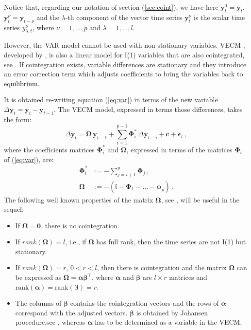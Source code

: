 Notice that, regarding our notation of section (\ref{sec:coint}),
we have here 
$\mathbf{y}_t^0 = \mathbf{y}_t$,
$\mathbf{y}_t^\nu = \mathbf{y}_{t-\nu}$ and
the $\lambda$-th component of the vector time series $\mathbf{y}_t^\nu$
is the scalar time series $y_{\lambda,t}^\nu$, where $\nu=1,\dots,p$ and
$\lambda=1,\dots,l$.

However, the VAR model cannot be used with non-stationary variables. VECM ,
developed by \cite{engle87}, is also a linear model for I(1) variables that are
also cointegrated, see \cite{banerjee1993}. If cointegration exists, variable
differences are stationary and they introduce an error correction term which
adjusts coefficients to bring the variables back to equilibrium. 


It is obtained re-writing equation (\ref{eq:var}) in terms of the new
variable $\Delta\mathbf{y}_t=\mathbf{y}_t-\mathbf{y}_{t-1}$.
The VECM model, expressed in terms those differences, takes the form:
\begin{equation}\label{eq:vec}
\Delta \mathbf{y}_t 
= \boldsymbol{\Omega}\,\mathbf{y}_{t-1}
  + \sum_{i=1}^{p-1} \boldsymbol{\Phi}_i^*\,\Delta\mathbf{y}_{t-i}
  + \mathbf{c} + \boldsymbol{\epsilon}_t\,,
\end{equation}
\noindent
where the coefficients matrices $\boldsymbol{\Phi}_i^*$ and 
$\boldsymbol{\Omega}$, expressed in terms of the matrices
$\boldsymbol{\Phi}_i$ of (\ref{eq:var}), are:
\begin{align*}
\boldsymbol{\Phi}_i^* 
&:= -\sum_{j=i+1}^{p}\boldsymbol{\Phi}_j\,, \\
\boldsymbol{\Omega}
&:= -\left( \mathbb{I} - \boldsymbol{\Phi}_1 - \dots 
    - \boldsymbol{\phi}_p \right)\,. 
\end{align*}
The following well known properties of the matrix $\boldsymbol{\Omega}$, see
\cite{johansen1995}, will be useful in the sequel:
\begin{itemize}
\item
If $\boldsymbol{\Omega} = \mathbf{0}$, there is no cointegration.
\item 
If $rank(\boldsymbol{\Omega})=l$, i.e., if $\boldsymbol{\Omega}$ has
full rank, then the time series are not I(1) but stationary.
\item
If $rank(\boldsymbol{\Omega})=r$, $0<r<l$, then there is cointegration
and the matrix $\boldsymbol{\Omega}$ can be expressed as
$\boldsymbol{\Omega}=\boldsymbol{\alpha\beta}^\top$, where $\boldsymbol{\alpha}$
and $\boldsymbol{\beta}$ are
$l\times r$ matrices and
$\text{rank}(\boldsymbol{\alpha})=\text{rank}(\boldsymbol{\beta})=r$.
\item
The columns of $\boldsymbol{\beta}$ contains the cointegration vectors and the rows of
$\boldsymbol{\alpha}$ correspond with the adjusted vectors. 
$\boldsymbol{\beta}$ is obtained by Johansen procedure,see \cite{johansen1988},
whereas $\boldsymbol{\alpha}$ has to be determined as a variable in the VECM.
\end{itemize}
